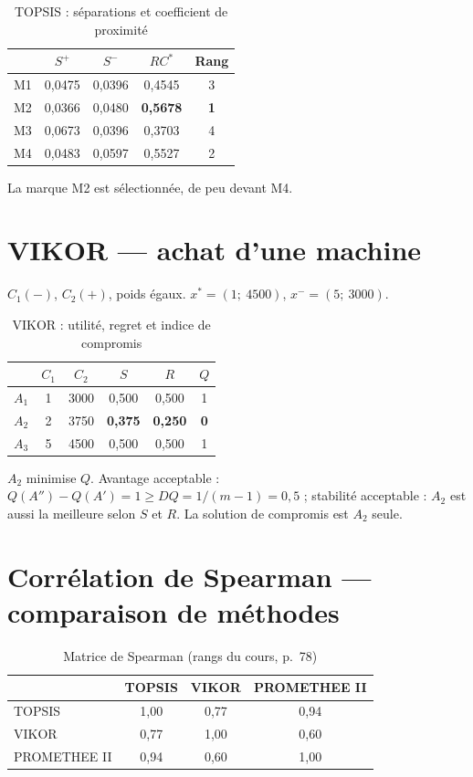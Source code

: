 \documentclass[11pt,a4paper]{report}
\theoremstyle{definition}
\theoremstyle{remark}
\begin{document}
\begin{table}[H]
\centering
\caption{TOPSIS : séparations et coefficient de proximité}\label{tab:topsis2}
\begin{tabular}{lcccc}
\toprule
 & $S^+$ & $S^-$ & $RC^*$ & Rang\\
\midrule
M1 & 0,0475 & 0,0396 & 0,4545 & 3\\
M2 & 0,0366 & 0,0480 & \textbf{0,5678} & \textbf{1}\\
M3 & 0,0673 & 0,0396 & 0,3703 & 4\\
M4 & 0,0483 & 0,0597 & 0,5527 & 2\\
\bottomrule
\end{tabular}
\end{table}

La marque M2 est sélectionnée, de peu devant M4.

\section{VIKOR --- achat d'une machine}

$C_1(-)$, $C_2(+)$, poids égaux. $x^*=(1;\ 4500)$, $x^-=(5;\ 3000)$.

\begin{table}[H]
\centering
\caption{VIKOR : utilité, regret et indice de compromis}\label{tab:vikor}
\begin{tabular}{lccccc}
\toprule
 & $C_1$ & $C_2$ & $S$ & $R$ & $Q$\\
\midrule
$A_1$ & 1 & 3000 & 0,500 & 0,500 & 1\\
$A_2$ & 2 & 3750 & \textbf{0,375} & \textbf{0,250} & \textbf{0}\\
$A_3$ & 5 & 4500 & 0,500 & 0,500 & 1\\
\bottomrule
\end{tabular}
\end{table}

$A_2$ minimise $Q$. Avantage acceptable : $Q(A'')-Q(A')=1\ge DQ=1/(m-1)=0{,}5$ ; stabilité acceptable :
$A_2$ est aussi la meilleure selon $S$ et $R$. La solution de compromis est $A_2$ seule.

\section{Corrélation de Spearman --- comparaison de méthodes}

\begin{table}[H]
\centering
\caption{Matrice de Spearman (rangs du cours, p.~78)}\label{tab:spearman}
\begin{tabular}{lccc}
\toprule
 & TOPSIS & VIKOR & PROMETHEE II\\
\midrule
TOPSIS & 1,00 & 0,77 & 0,94\\
VIKOR & 0,77 & 1,00 & 0,60\\
PROMETHEE II & 0,94 & 0,60 & 1,00\\
\bottomrule
\end{tabular}
\end{table}
\end{document}

